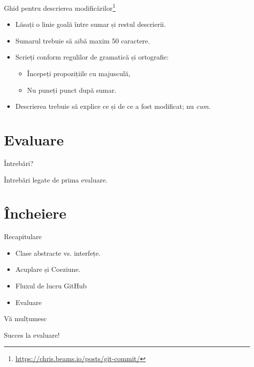 \documentclass[presentation]{beamer}
\begin{document}
\begin{frame}[label={sec:org7e975e7}]{Ghid pentru descrierea modificărilor\footnote{\url{https://chris.beams.io/posts/git-commit/}}}
\begin{itemize}
\item Lăsați o linie goală între sumar și restul descrierii.
\item Sumarul trebuie să aibă maxim 50 caractere.
\item Scrieți conform regulilor de gramatică și ortografie:
\begin{itemize}
\item Începeți propozițiile cu majusculă,
\item Nu puneți punct după sumar.
\end{itemize}
\item Descrierea trebuie să explice \alert{ce} și \alert{de ce} a fost modificat; nu \emph{cum}.
\end{itemize}
\end{frame}
\section{Evaluare}
\label{sec:orgfa6717f}
\begin{frame}[label={sec:org8fabe1c}]{Întrebări?}
\begin{center}
Întrebări legate de prima evaluare.
\end{center}
\end{frame}
\section{Încheiere}
\label{sec:org8a0f8ff}
\begin{frame}[label={sec:orgc2a743f}]{Recapitulare}
\begin{itemize}
\item Clase abstracte vs. interfețe.
\item Acuplare și Coeziune.
\item Fluxul de lucru GitHub
\item Evaluare
\end{itemize}
\end{frame}
\begin{frame}[label={sec:org51fa549}]{Vă mulțumesc}
\begin{center}
Succes la evaluare!
\end{center}
\end{frame}
\end{document}
